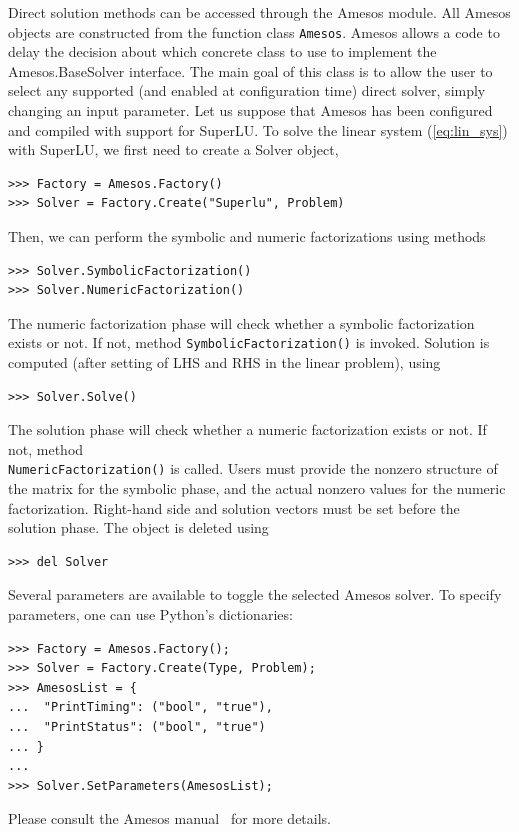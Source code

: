 \documentclass[10pt,relax]{SANDreport}
\begin{document}
Direct solution methods can be accessed through the Amesos module.
All Amesos objects are constructed from the function class
\verb!Amesos!.  Amesos allows a code to delay the
decision about which concrete class to use to implement the
Amesos.BaseSolver interface. The main goal of this class is to allow
the user to select any supported (and enabled at configuration time)
direct solver, simply changing an input parameter. Let us suppose that Amesos
has been configured and compiled with support for SuperLU. To solve the linear
system (\ref{eq:lin_sys}) with SuperLU, we first need to create a Solver
object,
\begin{verbatim}
>>> Factory = Amesos.Factory()
>>> Solver = Factory.Create("Superlu", Problem)
\end{verbatim}
Then, we can perform the symbolic and numeric factorizations using methods
\begin{verbatim}
>>> Solver.SymbolicFactorization()
>>> Solver.NumericFactorization()
\end{verbatim}
The numeric factorization phase will check whether a symbolic
factorization exists or not. If not, method
\verb!SymbolicFactorization()! is invoked.  Solution is computed (after
setting of LHS and RHS in the linear problem), using
\begin{verbatim}
>>> Solver.Solve()
\end{verbatim}
The solution phase will check whether a numeric factorization exists or
not. If not, method \\ \verb!NumericFactorization()! is called.
Users must provide the nonzero structure of the matrix for the symbolic
phase, and the actual nonzero values for the numeric
factorization. Right-hand side and solution vectors must be set before
the solution phase.
The object is deleted using
\begin{verbatim}
>>> del Solver
\end{verbatim}
  
Several parameters are available to toggle the selected Amesos solver.
To specify parameters, one can use Python's dictionaries:
\begin{verbatim}
>>> Factory = Amesos.Factory();
>>> Solver = Factory.Create(Type, Problem);
>>> AmesosList = {
...  "PrintTiming": ("bool", "true"),
...  "PrintStatus": ("bool", "true")
... }
...
>>> Solver.SetParameters(AmesosList);
\end{verbatim}
Please consult the Amesos manual~\cite{Amesos-Reference-Guide} for more
details.

\end{document}

